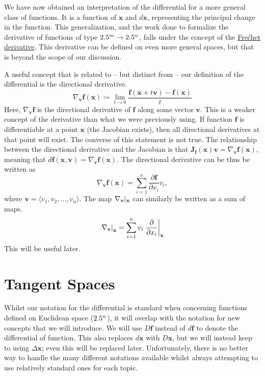 \documentclass[a4paper,12pt]{article}
\begin{document}
We have now obtained an interpretation of the differential for a more general class of functions. 
It is a function of $\mathbf{x}$ and $d\mathbf{x}$, representing the principal change in the function.
This generalization, and the work done to formalize the derivative of functions of type $2.5^m \to 2.5^n$, falls under the concept of the \href{https://en.wikipedia.org/wiki/Fr%C3%A9chet_derivative}{Fre\'chet derivative}.
This derivative can be defined on even more general spaces, but that is beyond the scope of our discussion.

A useful concept that is related to -- but distinct from -- our definition of the differential is the directional derivative.
\begin{equation*}
    \nabla_\mathbf{v}\mathbf{f}(\mathbf{x}) \coloneq \lim_{t \to 0} \frac{\mathbf{f}(\mathbf{x}+t\mathbf{v}) - \mathbf{f}(\mathbf{x})}{t}
\end{equation*}
Here, $\nabla_\mathbf{v}\mathbf{f}$ is the directional derivative of $\mathbf{f}$ along some vector $\mathbf{v}$.
This is a weaker concept of the derivative than what we were previously using.
If function $\mathbf{f}$ is differentiable at a point $\mathbf{x}$ (the Jacobian exists), then all directional derivatives at that point will exist.
The converse of this statement is not true.
The relationship between the directional derivative and the Jacobian is that $\mathbf{J_f}(\mathbf{x})\mathbf{v} = \nabla_\mathbf{v}\mathbf{f}(\mathbf{x})$, meaning that $d\mathbf{f}(\mathbf{x}, \mathbf{v}) = \nabla_\mathbf{v}\mathbf{f}(\mathbf{x})$.
The directional derivative can be thus be written as
\begin{equation*}
    \nabla_\mathbf{v} \mathbf{f}(\mathbf{x}) = \sum_{i=1}^{n} \frac{\partial\mathbf{f}}{\partial x_i} v_i,
\end{equation*}
where $\mathbf{v} = \langle v_1, v_2, \ldots, v_n \rangle$.
The map $\eval*{\nabla_\mathbf{v}}{\mathbf{x}}$ can similarly be written as a sum of maps.
\begin{equation*}
    \eval{\nabla_\mathbf{v}}{\mathbf{x}} = \sum_{i=1}^{n} v_i \eval{\frac{\partial}{\partial x_i}}{\mathbf{x}}
\end{equation*}
This will be useful later.

\section{Tangent Spaces}

Whilst our notation for the differential is standard when concerning functions defined on Euclidean space ($2.5^n$), it will overlap with the notation for new concepts that we will introduce.
We will use $D\mathbf{f}$ instead of $d\mathbf{f}$ to denote the differential of function.
This also replaces $d\mathbf{x}$ with $D\mathbf{x}$, but we will instead keep to using $\Delta\mathbf{x}$; even this will be replaced later.
Unfortunately, there is no better way to handle the many different notations available whilst always attempting to use relatively standard ones for each topic.
\end{document}
